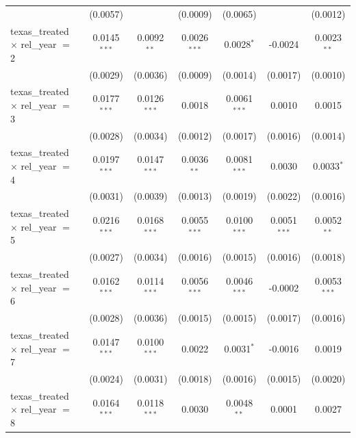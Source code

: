 \begin{tabular}{lcccccc}
                                                & (0.0057)       &                & (0.0009)        & (0.0065)        &                 & (0.0012)\\   
   texas\_treated $\times$ rel\_year $=$ 2      & 0.0145$^{***}$ & 0.0092$^{**}$  & 0.0026$^{***}$  & 0.0028$^{*}$    & -0.0024         & 0.0023$^{**}$\\   
                                                & (0.0029)       & (0.0036)       & (0.0009)        & (0.0014)        & (0.0017)        & (0.0010)\\   
   texas\_treated $\times$ rel\_year $=$ 3      & 0.0177$^{***}$ & 0.0126$^{***}$ & 0.0018          & 0.0061$^{***}$  & 0.0010          & 0.0015\\   
                                                & (0.0028)       & (0.0034)       & (0.0012)        & (0.0017)        & (0.0016)        & (0.0014)\\   
   texas\_treated $\times$ rel\_year $=$ 4      & 0.0197$^{***}$ & 0.0147$^{***}$ & 0.0036$^{**}$   & 0.0081$^{***}$  & 0.0030          & 0.0033$^{*}$\\   
                                                & (0.0031)       & (0.0039)       & (0.0013)        & (0.0019)        & (0.0022)        & (0.0016)\\   
   texas\_treated $\times$ rel\_year $=$ 5      & 0.0216$^{***}$ & 0.0168$^{***}$ & 0.0055$^{***}$  & 0.0100$^{***}$  & 0.0051$^{***}$  & 0.0052$^{**}$\\   
                                                & (0.0027)       & (0.0034)       & (0.0016)        & (0.0015)        & (0.0016)        & (0.0018)\\   
   texas\_treated $\times$ rel\_year $=$ 6      & 0.0162$^{***}$ & 0.0114$^{***}$ & 0.0056$^{***}$  & 0.0046$^{***}$  & -0.0002         & 0.0053$^{***}$\\   
                                                & (0.0028)       & (0.0036)       & (0.0015)        & (0.0015)        & (0.0017)        & (0.0016)\\   
   texas\_treated $\times$ rel\_year $=$ 7      & 0.0147$^{***}$ & 0.0100$^{***}$ & 0.0022          & 0.0031$^{*}$    & -0.0016         & 0.0019\\   
                                                & (0.0024)       & (0.0031)       & (0.0018)        & (0.0016)        & (0.0015)        & (0.0020)\\   
   texas\_treated $\times$ rel\_year $=$ 8      & 0.0164$^{***}$ & 0.0118$^{***}$ & 0.0030          & 0.0048$^{**}$   & 0.0001          & 0.0027\\   

\end{tabular}
